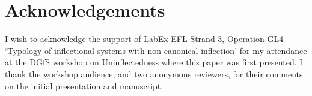 \documentclass[output=paper,colorlinks,citecolor=brown]{langscibook}
\begin{document}
\section*{Acknowledgements}
I wish to acknowledge the support of LabEx EFL Strand 3, Operation GL4 `Typology of inflectional systems with non-canonical inflection' for my attendance at the DGfS workshop on Uninflectedness where this paper was first presented. I thank the workshop audience, and two anonymous reviewers, for their comments on the initial presentation and manuscript.



{\sloppy\printbibliography[heading=subbibliography,notkeyword=this]}
\end{document}
